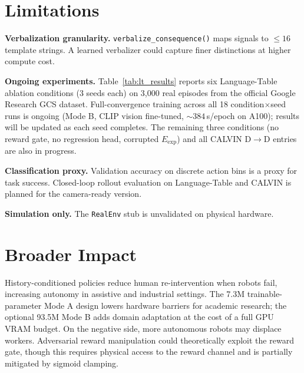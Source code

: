 \documentclass{article}
\newcommand{\Lexp}{$E_{\mathrm{exp}}$\xspace}
\begin{document}
\section*{Limitations}

\textbf{Verbalization granularity.}
\texttt{verbalize\_consequence()} maps signals to $\leq16$ template strings.
A learned verbalizer could capture finer distinctions at higher compute cost.

\textbf{Ongoing experiments.}
Table~\ref{tab:lt_results} reports six Language-Table ablation conditions
(3 seeds each) on 3,000 real episodes from the official Google Research GCS dataset.
Full-convergence training across all 18 condition$\times$seed runs is ongoing
(Mode B, CLIP vision fine-tuned, $\sim\!384$\,s/epoch on A100); results will
be updated as each seed completes.
The remaining three conditions (no reward gate, no regression head,
corrupted \Lexp) and all CALVIN D$\to$D entries are also in progress.

\textbf{Classification proxy.}
Validation accuracy on discrete action bins is a proxy for task success.
Closed-loop rollout evaluation on Language-Table and CALVIN is planned for
the camera-ready version.

\textbf{Simulation only.}
The \texttt{RealEnv} stub is unvalidated on physical hardware.

\section*{Broader Impact}

History-conditioned policies reduce human re-intervention when robots fail,
increasing autonomy in assistive and industrial settings.
The 7.3M trainable-parameter Mode A design lowers hardware barriers for
academic research; the optional 93.5M Mode B adds domain adaptation at
the cost of a full GPU VRAM budget.
On the negative side, more autonomous robots may displace workers.
Adversarial reward manipulation could theoretically exploit the reward gate,
though this requires physical access to the reward channel and is partially
mitigated by sigmoid clamping.

\clearpage
{}
\end{document}
